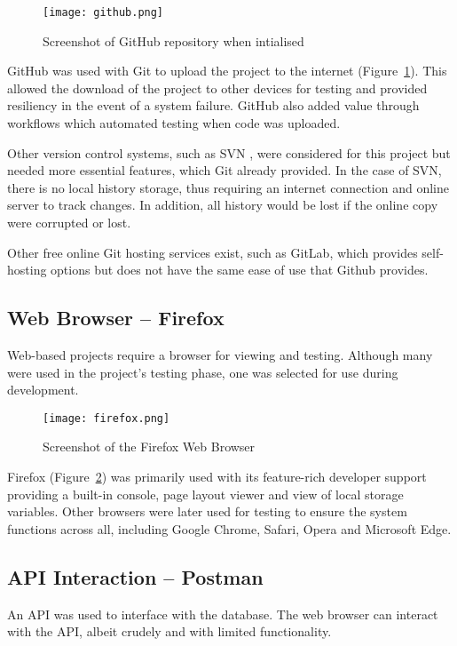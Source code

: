 \begin{figure}[ht!]
    \centerline{\texttt{[image: github.png]}}
    \caption{Screenshot of GitHub repository when intialised}
    \label{fig:github}
\end{figure}

GitHub was used with Git \parencite{tsitoara_beginning_2020} to upload the project to the internet (Figure~\ref{fig:github}). This allowed the download of the project to other devices for testing and provided resiliency in the event of a system failure. GitHub also added value through workflows which automated testing when code was uploaded.

Other version control systems, such as SVN \parencite{pilato_version_2008}, were considered for this project but needed more essential features, which Git already provided. In the case of SVN, there is no local history storage, thus requiring an internet connection and online server to track changes. In addition, all history would be lost if the online copy were corrupted or lost.

Other free online Git hosting services exist, such as GitLab, which provides self-hosting options but does not have the same ease of use that Github provides.


\subsection{Web Browser -- Firefox}
Web-based projects require a browser for viewing and testing. Although many were used in the project's testing phase, one was selected for use during development.

\begin{figure}[ht!]
    \centerline{\texttt{[image: firefox.png]}}
    \caption{Screenshot of the Firefox Web Browser}
    \label{fig:firefox}
\end{figure}

Firefox (Figure~\ref{fig:firefox}) was primarily used with its feature-rich developer support providing a built-in console, page layout viewer and view of local storage variables. Other browsers were later used for testing to ensure the system functions across all, including Google Chrome, Safari, Opera and Microsoft Edge.


\subsection{API Interaction -- Postman}
An API was used to interface with the database. The web browser can interact with the API, albeit crudely and with limited functionality.

